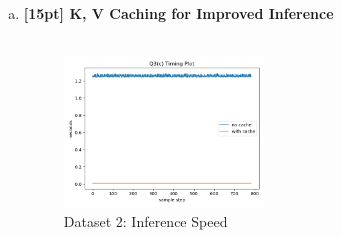 \documentclass{article}
\begin{document}
\begin{enumerate}[(a)]
\newpage

\item {\bf [15pt] K, V Caching for Improved Inference} \\\\
\begin{figure}[H]
    \centering
    \includegraphics[width=0.5\textwidth]{figures/q3_c_dset2_timing_plot.png}
    \caption{Dataset 2: Inference Speed}
\end{figure}


\end{enumerate}
\end{document}
